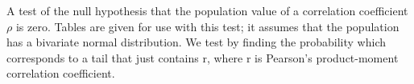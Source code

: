  A test of the null hypothesis that the population value of a
correlation coefficient $ \rho $ is zero. Tables are given for
use with this test; it assumes that the population has a 
bivariate normal distribution. We test by finding 
the probability which corresponds to a tail that just 
contains r, where r is Pearson's product-moment correlation
coefficient.
